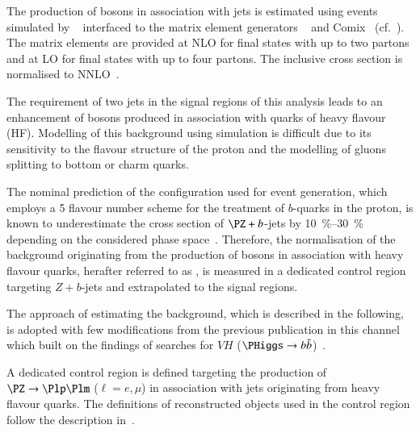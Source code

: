 %
%

The production of \PZ bosons in association with jets is estimated
using events simulated by \SHERPA[2.2.1]~\cite{Bothmann:2019yzt}
interfaced to the matrix element generators
\OPENLOOPS~\cite{Buccioni:2019sur,Cascioli:2011va,Denner:2016kdg} and
Comix~\cite{Gleisberg:2008fv} (cf.\
). The matrix elements are provided at
NLO for final states with up to two partons and at LO for final states
with up to four partons. The inclusive cross section is normalised to
NNLO~\cite{Anastasiou:2003ds}.

The requirement of two \btagged jets in the signal regions of this
analysis leads to an enhancement of \PZ bosons produced in association
with quarks of heavy flavour (HF). Modelling of this background using
simulation is difficult due to its sensitivity to the flavour
structure of the proton and the modelling of gluons splitting to
bottom or charm quarks.

The nominal prediction of the \SHERPA[2.2.1] configuration used for
event generation, which employs a 5 flavour number scheme for the
treatment of $b$-quarks in the proton, is known to underestimate the
cross section of $\PZ + b$-jets by \SIrange{10}{30}{\percent}
depending on the considered phase
space~\cite{STDM-2017-38}. Therefore, the normalisation of the
background originating from the production of \PZ bosons in
association with heavy flavour quarks, herafter referred to as \ZHF,
is measured in a dedicated control region targeting $Z + b$-jets and
extrapolated to the signal regions.

The approach of estimating the \ZHF background, which is described in
the following, is adopted with few modifications from the previous
publication in this channel~\cite{HIGG-2016-16-witherratum} which
built on the findings of searches for $VH$
($\PHiggs \to \bbbar$)~\cite{HIGG-2016-29}.\todo{Cite Petar's thesis
  here.}

A dedicated control region is defined targeting the production of
$\PZ \ra \Plp\Plm$ ($\ell = e , \mu$) in association with jets
originating from heavy flavour quarks. The definitions of
reconstructed objects used in the control region follow the
description in~.

